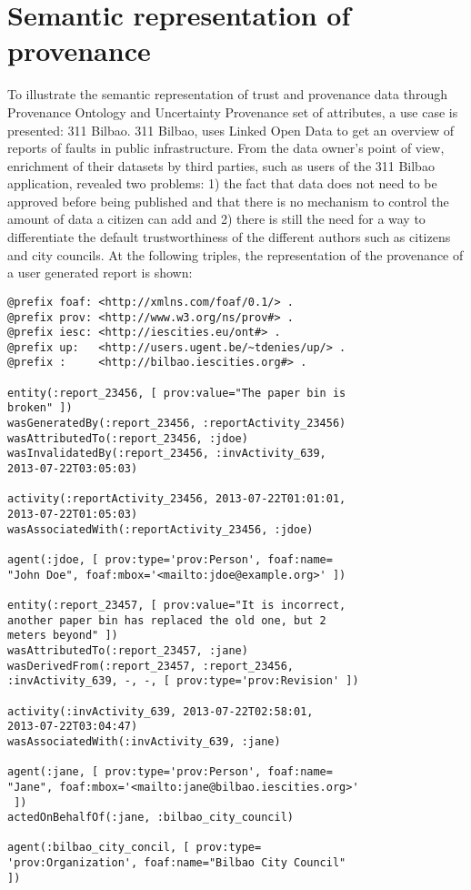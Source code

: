\section{Semantic representation of provenance}
\label{sec:use_cases}

To illustrate the semantic representation of trust and provenance data through Provenance Ontology and Uncertainty Provenance set of attributes, a use case is presented: 311 Bilbao. 311 Bilbao, uses Linked Open Data to get an overview of reports of faults in public infrastructure. From the data owner’s point of view, enrichment of their datasets by third parties, such as users of the 311 Bilbao application, revealed two problems: 1) the fact that data does not need to be approved before being published and that there is no mechanism to control the amount of data a citizen can add and 2) there is still the need for a way to differentiate the default trustworthiness of the different authors such as citizens and city councils. At the following triples, the representation of the provenance of a user generated report is shown:

\lstset{numbers=left, basicstyle=\ttfamily\scriptsize,}
\begin{lstlisting}
@prefix foaf: <http://xmlns.com/foaf/0.1/> .
@prefix prov: <http://www.w3.org/ns/prov#> .
@prefix iesc: <http://iescities.eu/ont#> .
@prefix up:   <http://users.ugent.be/~tdenies/up/> .
@prefix :     <http://bilbao.iescities.org#> .

entity(:report_23456, [ prov:value="The paper bin is 
broken" ])
wasGeneratedBy(:report_23456, :reportActivity_23456)
wasAttributedTo(:report_23456, :jdoe)
wasInvalidatedBy(:report_23456, :invActivity_639, 
2013-07-22T03:05:03)

activity(:reportActivity_23456, 2013-07-22T01:01:01, 
2013-07-22T01:05:03)
wasAssociatedWith(:reportActivity_23456, :jdoe)

agent(:jdoe, [ prov:type='prov:Person', foaf:name=
"John Doe", foaf:mbox='<mailto:jdoe@example.org>' ])

entity(:report_23457, [ prov:value="It is incorrect, 
another paper bin has replaced the old one, but 2 
meters beyond" ])
wasAttributedTo(:report_23457, :jane)
wasDerivedFrom(:report_23457, :report_23456, 
:invActivity_639, -, -, [ prov:type='prov:Revision' ])

activity(:invActivity_639, 2013-07-22T02:58:01, 
2013-07-22T03:04:47)
wasAssociatedWith(:invActivity_639, :jane)

agent(:jane, [ prov:type='prov:Person', foaf:name=
"Jane", foaf:mbox='<mailto:jane@bilbao.iescities.org>'
 ])
actedOnBehalfOf(:jane, :bilbao_city_council)

agent(:bilbao_city_concil, [ prov:type=
'prov:Organization', foaf:name="Bilbao City Council" 
])

\end{lstlisting}

